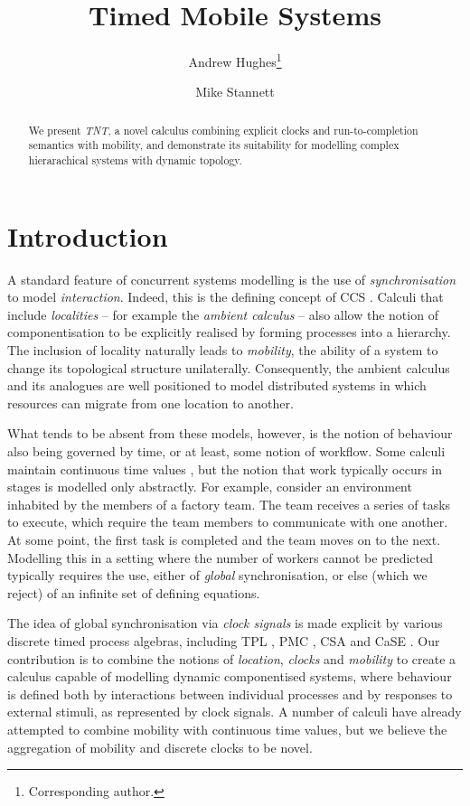 \documentclass[orivec,envcountsame]{llncs}
\title{Timed Mobile Systems}
\author{Andrew Hughes\thanks{Corresponding author.} \and Mike Stannett}
\institute{Department of Computer Science, University of Sheffield, \\
  Regent Court, 211 Portobello Street, Sheffield S1 4DP, UK. \\
  \email{a.hughes@dcs.shef.ac.uk}
}
\begin{document}
\maketitle

\begin{abstract}

We present \emph{TNT}, a novel calculus combining explicit clocks and
run-to-completion semantics with mobility, and demonstrate its
suitability for modelling complex hierarachical systems with dynamic
topology.

\end{abstract}

\section{Introduction}
\label{introduction}

A standard feature of concurrent systems modelling is the use of
\emph{synchronisation} to model \emph{interaction}. Indeed, this is the
defining concept of CCS \cite{milner:ccs}. Calculi that include
\emph{localities} -- for example the \emph{ambient calculus} \cite{amb}
-- also allow the notion of componentisation to be explicitly realised
by forming processes into a hierarchy. The inclusion of locality
naturally leads to \emph{mobility}, the ability of a system to change
its topological structure unilaterally. Consequently, the ambient
calculus and its analogues are well positioned to model distributed
systems in which resources can migrate from one location to another.

What tends to be absent from these models, however, is the notion of
behaviour also being governed by time, or at least, some notion of
workflow. Some calculi maintain continuous time values
\cite{tccs,beaten:timing,brics:lee}, but the notion that work typically
occurs in stages is modelled only abstractly. For example, consider an
environment inhabited by the members of a factory team. The team
receives a series of tasks to execute, which require the team members to
communicate with one another. At some point, the first task is completed
and the team moves on to the next. Modelling this in a setting where the
number of workers cannot be predicted typically requires the use, either
of \emph{global} synchronisation, or else (which we reject) of an
infinite set of defining equations.

The idea of global synchronisation via \emph{clock signals} is made explicit by
various discrete timed process algebras, including TPL \cite{hennessy:tpl}, PMC
\cite{pmc}, CSA \cite{csa} and CaSE \cite{case,norton05alg}. Our contribution is
to combine the notions of \emph{location}, \emph{clocks} and \emph{mobility} to
create a calculus capable of modelling dynamic componentised systems, where
behaviour is defined both by interactions between individual processes and by
responses to external stimuli, as represented by clock signals. A number of
calculi \cite{lee:realtime,satoh:phd,webpi} have already attempted to combine
mobility with continuous time values, but we believe the aggregation
of mobility and discrete clocks to be novel.
\end{document}
